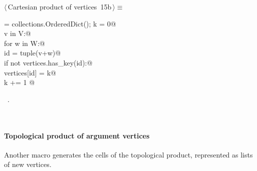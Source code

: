 \documentclass[11pt,oneside]{article}	%
\begin{document}
\begin{flushleft} \small
\begin{minipage}{\linewidth} \label{scrap21}
\protect{}$\langle\,$Cartesian product of vertices\nobreak\ {\footnotesize 15b}$\,\rangle\equiv$
\vspace{-1ex}
\begin{list}{}{} \item
\mbox{}\verb@vertices = collections.OrderedDict(); k = 0@\\
\mbox{}\verb@for v in V:@\\
\mbox{}\verb@    for w in W:@\\
\mbox{}\verb@        id = tuple(v+w)@\\
\mbox{}\verb@        if not vertices.has_key(id):@\\
\mbox{}\verb@            vertices[id] = k@\\
\mbox{}\verb@            k += 1   @{\NWsep}
\end{list}
\vspace{-1ex}
\footnotesize\addtolength{\baselineskip}{-1ex}
\begin{list}{}{\setlength{\itemsep}{-\parsep}\setlength{\itemindent}{-\leftmargin}}
\item \NWtxtMacroRefIn\ .
\end{list}
\end{minipage}\\[4ex]
\end{flushleft}


\paragraph{Topological product of argument vertices}
Another macro generates the cells of the topological product, represented as lists of new vertices. 
\end{document}

